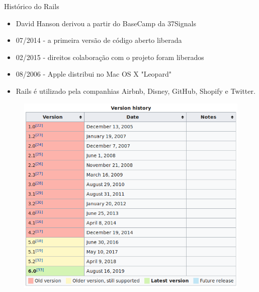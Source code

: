 \begin{frame}{Histórico do Rails}
  \begin{itemize}
    \item David Hanson \alert{derivou} a partir do BaseCamp da 37Signals
    \item 07/2014 - a primeira versão de código aberto liberada
    \item 02/2015 - direitos \alert{colaboração} com o projeto foram liberados
    \item 08/2006 - Apple distribui no Mac OS X "Leopard"
    \item Rails é utilizado pela companhias Airbnb, Disney, GitHub, Shopify e Twitter.
  \end{itemize}

  \begin{figure}[h]
    \includegraphics[scale=0.3]{imagens/rails-history.png}  
  \end{figure}
\end{frame}
